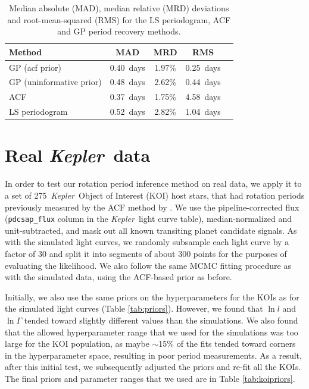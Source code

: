 \documentclass[a4paper,fleqn,usenatbib,useAMS]{mnras}
\newcommand{\Kepler}{{\it Kepler}}
\newcommand{\kepler}{\Kepler}
\newcommand{\nkoimcq}{275}
\newcommand{\pgramRMS}{1.04}
\newcommand{\pgramMAD}{0.52}
\newcommand{\percentpgramMAD}{2.82}
\newcommand{\gpRMS}{0.25}
\newcommand{\gpMAD}{0.40}
\newcommand{\percentgpMAD}{1.97}
\newcommand{\gpRMSnp}{0.44}
\newcommand{\gpMADnp}{0.48}
\newcommand{\percentgpMADnp}{2.62}
\newcommand{\telavivRMS}{4.58}
\newcommand{\telavivMAD}{0.37}
\newcommand{\percenttelavivMAD}{1.75}
\begin{document}
\begin{table}
\begin{center}
    \caption{Median absolute (MAD), median relative (MRD) deviations and
    root-mean-squared (RMS) for
    the LS periodogram, \citet{Mcquillan2013} ACF and GP period recovery
    methods.}
\begin{tabular}{lcccc}
    Method & MAD & MRD & RMS \\
    \hline
    GP (acf prior) & \gpMAD\ days & \percentgpMAD \% & \gpRMS\ days \\
    GP (uninformative prior) & \gpMADnp\ days & \percentgpMADnp \% &
    \gpRMSnp\ days \\
    ACF & \telavivMAD\ days & \percenttelavivMAD \%
    & \telavivRMS\ days \\
    LS periodogram & \pgramMAD\ days & \percentpgramMAD \% & \pgramRMS\ days\\
\end{tabular}
\end{center}
\end{table}
\label{tab:MADs}

\section{Real \kepler\ data}
\label{sec:kepler}

In order to test our rotation period inference method on real data,
we apply it to a set of \nkoimcq\ \Kepler\ Object of Interest (KOI)
host stars, that had rotation periods previously measured by
the ACF method by \citet{Mcquillan2013}.
We use the pipeline-corrected flux (\texttt{pdcsap\_flux} column in the
\Kepler\ light curve table), median-normalized and unit-subtracted, and mask
out all known transiting planet candidate signals.
As with the simulated light curves, we randomly subsample each
light curve by a factor of 30 and split it into segments of about 300 points
for the purposes of evaluating the likelihood.
We also follow the same MCMC fitting procedure as with the simulated data,
using the ACF-based prior as before.

Initially, we also use the same priors on the hyperparameters for the KOIs
as for the simulated light curves (Table \ref{tab:priors}).
However, we found that $\ln l$ and $\ln \Gamma$ tended toward slightly
different values than the simulations.
We also found that the allowed hyperparameter range that we used for the
simulations was too large for the KOI population, as maybe $\sim$15\% of the
fits tended toward corners in the hyperparameter space, resulting in poor
period measurements.
As a result, after this initial test, we subsequently adjusted the priors and
re-fit all the KOIs.
The final priors and parameter ranges that we used are in Table
\ref{tab:koipriors}.
\end{document}
